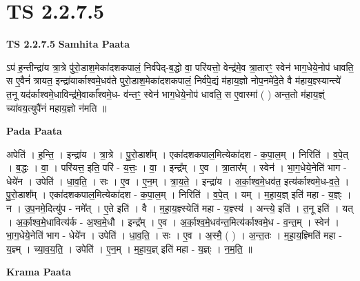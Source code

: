 \documentclass[17pt]{extarticle}
\begin{document}
\section{ TS 2.2.7.5 }

\textbf{TS 2.2.7.5 } \newline
\textbf{Samhita Paata} \newline

ऽप॑ ह॒न्तीन्द्रा॑य त्रा॒त्रे पु॑रो॒डाश॒मेका॑दशकपालं॒ निर्व॑पेद्-ब॒द्धो वा॒ परि॑यत्तो॒ वेन्द्र॑मे॒व त्रा॒तारꣳ॒॒ स्वेन॑ भाग॒धेये॒नोप॑ धावति॒ स ए॒वैनं॑ त्रायत॒ इन्द्रा॑यार्काश्वमे॒धव॑ते पुरो॒डाश॒मेका॑दशकपालं॒ निर्व॑पे॒द्यं म॑हाय॒ज्ञो नोप॒नमे॑दे॒ते वै म॑हाय॒ज्ञ्स्यान्त्ये॑ त॒नू यद॑र्काश्वमे॒धाविन्द्र॑मे॒वार्का᳚श्वमे॒ध- व॑न्तꣳ॒॒ स्वेन॑ भाग॒धेये॒नोप॑ धावति॒ स ए॒वास्मा॑ ( ) अन्त॒तो म॑हाय॒ज्ञ्ं च्या॑वय॒त्युपै॑नं महाय॒ज्ञो न॑मति ॥ \newline

\textbf{Pada Paata} \newline

अपेति॑ । ह॒न्ति॒ । इन्द्रा॑य । त्रा॒त्रे । पु॒रो॒डाश᳚म् । एका॑दशकपाल॒मित्येका॑दश - क॒पा॒ल॒म् । निरिति॑ । व॒पे॒त् । ब॒द्धः । वा॒ । परि॑यत्त॒ इति॒ परि॑ - य॒त्तः॒ । वा॒ । इन्द्र᳚म् । ए॒व । त्रा॒तार᳚म् । स्वेन॑ । भा॒ग॒धेये॒नेति॑ भाग - धेये॑न । उपेति॑ । धा॒व॒ति॒ । सः । ए॒व । ए॒न॒म् । त्रा॒य॒ते॒ । इन्द्रा॑य । अ॒र्का॒श्व॒मे॒धव॑त॒ इत्य॑र्काश्वमे॒ध-व॒ते॒ । पु॒रो॒डाश᳚म् । एका॑दशकपाल॒मित्येका॑दश - क॒पा॒ल॒म् । निरिति॑ । व॒पे॒त् । यम् । म॒हा॒य॒ज्ञ् इति॑ महा - य॒ज्ञ्ः । न । उ॒प॒नमे॒दित्यु॑प - नमे᳚त् । ए॒ते इति॑ । वै । म॒हा॒य॒ज्ञ्स्येति॑ महा - य॒ज्ञ्स्य॑ । अन्त्ये॒ इति॑ । त॒नू इति॑ । यत् । अ॒र्का॒श्व॒मे॒धावित्य॑र्क - अ॒श्व॒मे॒धौ । इन्द्र᳚म् । ए॒व । अ॒र्का॒श्व॒मे॒धव॑न्त॒मित्य॑र्काश्वमे॒ध - व॒न्त॒म् । स्वेन॑ । भा॒ग॒धेये॒नेति॑ भाग - धेये॑न । उपेति॑ । धा॒व॒ति॒ । सः । ए॒व । अ॒स्मै॒ ( ) । अ॒न्त॒तः । म॒हा॒य॒ज्ञ्मिति॑ महा - य॒ज्ञ्म् । च्या॒व॒य॒ति॒ । उपेति॑ । ए॒न॒म् । म॒हा॒य॒ज्ञ् इति॑ महा - य॒ज्ञ्ः । न॒म॒ति॒ ॥  \newline


\textbf{Krama Paata} \newline
\end{document}
